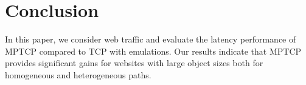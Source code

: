 \section{Conclusion}
\label{sec:conclusion}
In this paper, we consider web traffic and evaluate the latency performance of MPTCP compared to TCP with emulations. Our results indicate that MPTCP provides significant gains for websites with large object sizes both for homogeneous and heterogeneous paths. 




